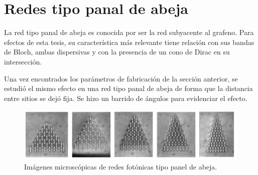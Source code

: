 \section{Redes tipo panal de abeja}
La red tipo panal de abeja es conocida por ser la red subyacente al grafeno. Para efectos de esta tesis, su característica más relevante tiene relación con sus bandas de Bloch, ambas dispersivas y con la presencia de un cono de Dirac en su intersección.

Una vez encontrados los parámetros de fabricación de la sección anterior, se estudió el mismo efecto en una red tipo panal de abeja de forma que la distancia entre sitios se dejó fija. Se hizo un barrido de ángulos para evidenciar el efecto. 
\begin{figure}[H]
\centering
	\includegraphics[width=\linewidth]{media/honeycomb_lattices_bw.png}
	\caption{Imágenes microscópicas de redes fotónicas tipo panel de abeja.\label{fig:HCLBW}}
\end{figure}